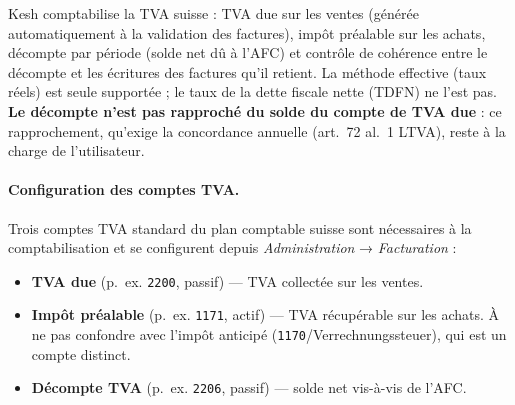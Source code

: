 \documentclass[a4paper,11pt,oneside]{article}
\begin{document}
Kesh comptabilise la TVA suisse : TVA due sur les ventes (générée automatiquement à la validation des factures), impôt préalable sur les achats, décompte par période (solde net dû à l'AFC) et contrôle de cohérence entre le décompte et les écritures des factures qu'il retient. La méthode effective (taux réels) est seule supportée ; le taux de la dette fiscale nette (TDFN) ne l'est pas. \textbf{Le décompte n'est pas rapproché du solde du compte de TVA due} : ce rapprochement, qu'exige la concordance annuelle (art.~72 al.~1 LTVA), reste à la charge de l'utilisateur.

\paragraph{Configuration des comptes TVA.} Trois comptes TVA standard du plan comptable suisse sont nécessaires à la comptabilisation et se configurent depuis \emph{Administration} → \emph{Facturation} :

\begin{itemize}
    \item \textbf{TVA due} (p.~ex. \texttt{2200}, passif) — TVA collectée sur les ventes.
    \item \textbf{Impôt préalable} (p.~ex. \texttt{1171}, actif) — TVA récupérable sur les achats. À ne pas confondre avec l'impôt anticipé (\texttt{1170}/Verrechnungssteuer), qui est un compte distinct.
    \item \textbf{Décompte TVA} (p.~ex. \texttt{2206}, passif) — solde net vis-à-vis de l'AFC.
\end{itemize}
\end{document}
